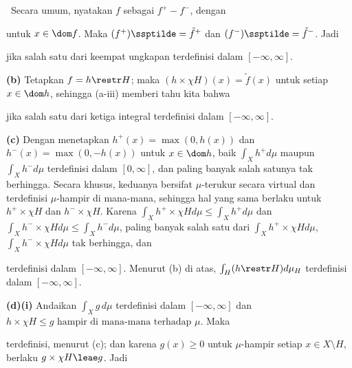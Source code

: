 {\medskip

\qquad\grheadb\ Secara umum, nyatakan $f$ sebagai $f^+-f^-$, dengan


\noindent untuk $x\in\dom f$. Maka $(f^+)\ssptilde=\tilde f^+$ dan
$(f^-)\ssptilde=\tilde f^-$. Jadi


\noindent jika salah satu dari keempat ungkapan terdefinisi dalam
$[-\infty,\infty]$.

\medskip

{\bf (b)} Tetapkan $f=h\restr H$; maka
$(h\times\chi H)(x)=\tilde f(x)$ untuk setiap $x\in\dom h$, sehingga
(a-iii) memberi tahu kita bahwa


\noindent jika salah satu dari ketiga integral terdefinisi dalam
$[-\infty,\infty]$.

\medskip

{\bf (c)} Dengan menetapkan $h^+(x)=\max(0,h(x))$ dan
$h^-(x)=\max(0,-h(x))$ untuk $x\in\dom h$, baik $\int_Xh^+d\mu$ maupun
$\int_Xh^-d\mu$ terdefinisi dalam $[0,\infty]$, dan paling banyak salah
satunya tak berhingga. Secara khusus, keduanya bersifat $\mu$-terukur secara
virtual dan terdefinisi $\mu$-hampir di mana-mana, sehingga hal yang sama
berlaku untuk $h^+\times\chi H$ dan $h^-\times\chi H$. Karena
$\int_Xh^+\times\chi Hd\mu\le\int_Xh^+d\mu$ dan
$\int_Xh^-\times\chi Hd\mu\le\int_Xh^-d\mu$, paling banyak salah satu dari
$\int_Xh^+\times\chi Hd\mu$, $\int_Xh^-\times\chi Hd\mu$ tak berhingga,
dan


\noindent terdefinisi dalam $[-\infty,\infty]$. Menurut (b) di atas,
$\int_H(h\restr H)d\mu_H$ terdefinisi dalam $[-\infty,\infty]$.

\medskip

{\bf (d)(i)} Andaikan $\int_Xg\,d\mu$ terdefinisi dalam
$[-\infty,\infty]$ dan
$h\times\chi H\le g\,\,\text{hampir di mana-mana terhadap }\mu$. Maka


\noindent terdefinisi, menurut (c); dan karena $g(x)\ge 0$ untuk
$\mu$-hampir setiap $x\in X\setminus H$, berlaku
$g\times\chi H\leae g$. Jadi

}
